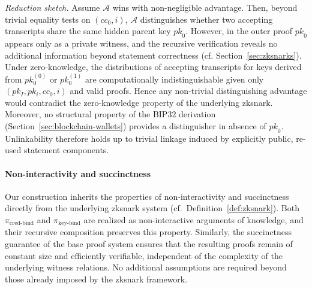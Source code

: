 \medskip
\textit{Reduction sketch.}
Assume $\mathcal{A}$ wins with non-negligible advantage. Then, beyond trivial equality tests on $(cc_0, i)$, $\mathcal{A}$ distinguishes whether two accepting transcripts share the same hidden parent key $\mathit{pk}_0$. However, in the outer proof $\mathit{pk}_0$ appears only as a private witness, and the recursive verification reveals no additional information beyond statement correctness (cf. Section~\ref{sec:zksnarks}). Under zero-knowledge, the distributions of accepting transcripts for keys derived from $pk_0^{(0)}$ or $pk_0^{(1)}$ are computationally indistinguishable given only $(pk_I, pk_i, cc_0, i)$ and valid proofs. Hence any non-trivial distinguishing advantage would contradict the zero-knowledge property of the underlying \acrshort{zksnark}. Moreover, no structural property of the BIP32 derivation (Section~\ref{sec:blockchain-wallets}) provides a distinguisher in absence of $\mathit{pk}_0$. Unlinkability therefore holds up to trivial linkage induced by explicitly public, re-used statement components.

\paragraph{Non-interactivity and succinctness}
Our construction inherits the properties of non-interactivity and succinctness directly from the underlying \acrshort{zksnark} system (cf.~Definition~\ref{def:zksnark}). Both $\pi_{\text{cred-bind}}$ and $\pi_{\text{key-bind}}$ are realized as non-interactive arguments of knowledge, and their recursive composition preserves this property. Similarly, the succinctness guarantee of the base proof system ensures that the resulting proofs remain of constant size and efficiently verifiable, independent of the complexity of the underlying witness relations. No additional assumptions are required beyond those already imposed by the \acrshort{zksnark} framework.
